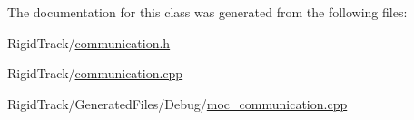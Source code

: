 The documentation for this class was generated from the following files\+:\begin{DoxyCompactItemize}
\item 
Rigid\+Track/\hyperlink{communication_8h}{communication.\+h}\item 
Rigid\+Track/\hyperlink{communication_8cpp}{communication.\+cpp}\item 
Rigid\+Track/\+Generated\+Files/\+Debug/\hyperlink{_debug_2moc__communication_8cpp}{moc\+\_\+communication.\+cpp}\end{DoxyCompactItemize}
